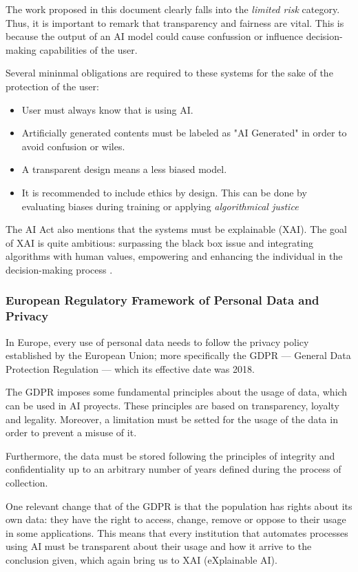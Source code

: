 \documentclass[12pt]{report} %
\begin{document}
The work proposed in this document clearly falls into the \textit{limited risk} category. Thus, it is important to remark that transparency and fairness are vital. This is because the output of an AI model could cause confussion or influence decision-making capabilities of the user. 

Several mininmal obligations are required to these systems for the sake of the protection of the user:

\begin{itemize}
	\item User must always know that is using AI.
	\item Artificially generated contents must be labeled as "AI Generated" in order to avoid confusion or wiles.
	\item A transparent design means a less biased model.
	\item It is recommended to include ethics by design. This can be done by evaluating biases during training or applying \textit{algorithmical justice}
\end{itemize}

The AI Act also mentions that the systems must be explainable (XAI). The goal of XAI is quite ambitious: surpassing the black box issue and integrating algorithms with human values, empowering and enhancing the individual in the decision-making process \cite{ALI2023101805}. 


\subsubsection{European Regulatory Framework of Personal Data and Privacy}

In Europe, every use of personal data needs to follow the privacy policy established by the European Union; more specifically the GDPR --- General Data Protection Regulation --- which its effective date was 2018. 

The GDPR imposes some fundamental principles about the usage of data, which can be used in AI proyects. These principles are based on transparency, loyalty and legality. Moreover, a limitation must be setted for the usage of the data in order to prevent a misuse of it.

Furthermore, the data must be stored following the principles of integrity and confidentiality up to an arbitrary number of years defined during the process of collection.

One relevant change that of the GDPR is that the population has rights about its own data: they have the right to access, change, remove or oppose to their usage in some applications. This means that every institution that automates processes using AI must be transparent about their usage and how it arrive to the conclusion given, which again bring us to XAI (eXplainable AI).
\end{document}
